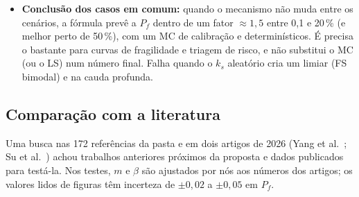 \documentclass[11pt,a4paper]{article}
\newcommand{\Pf}{P_f}
\begin{document}
\begin{itemize}
    com CoV$(c') = 0{,}1$: a cauda de baixo de $\Gamma$ é mais leve que a lognormal, e a fórmula fica do lado
    conservador. Calibrada só na referência (B), ela acerta $\alpha = 2$ (4,49 contra 4,42\,\%) e subestima nos
    $\alpha$ maiores, onde $\beta$ cresce (0,248 a 0,263); na família $h_w/H$ fica 15--30\,\% acima.
  \item \textbf{Conclusão dos casos em comum:} quando o mecanismo não muda entre os cenários, a fórmula prevê a $\Pf$
    dentro de um fator $\approx 1{,}5$ entre 0,1 e 20\,\% (e melhor perto de 50\,\%), com um MC de calibração e
    determinísticos. É precisa o bastante para curvas de fragilidade e triagem de risco, e não substitui o MC (ou o LS)
    num número final. Falha quando o $k_s$ aleatório cria um limiar (FS bimodal) e na cauda profunda.
\end{itemize}

\subsection{Comparação com a literatura}\label{sec:literatura}
Uma busca nas 172 referências da pasta  e em dois artigos de 2026 (Yang et
al.~\cite{yang2026}; Su et al.~\cite{su2026}) achou trabalhos anteriores próximos da proposta e
dados publicados para testá-la. Nos testes, $m$ e $\beta$ são ajustados por nós aos números dos artigos; os valores
lidos de figuras têm incerteza de $\pm 0{,}02$ a $\pm 0{,}05$ em $\Pf$.
\end{document}
